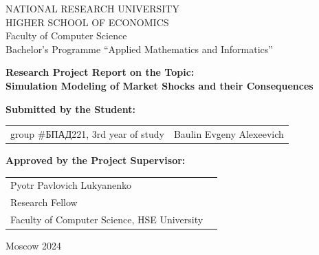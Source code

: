 \begin{titlepage}
    \newpage

    {
        \begin{center}
            NATIONAL RESEARCH UNIVERSITY\\
            HIGHER SCHOOL OF ECONOMICS
            \\
            \bigskip
            Faculty of Computer Science\\
            Bachelor’s Programme “Applied Mathematics and Informatics”
        \end{center}
    }

    \begin{center}
    {\bf Research Project Report on the Topic:}
        \\
        {\bf Simulation Modeling of Market Shocks and their Consequences}\\
    \end{center}

    \vspace{4em}

    {\bf Submitted by the Student: \vspace{2mm}}

    {
        \begin{tabular}{l@{\hskip 1.5cm}l}
            group \#\foreignlanguage{russian}{БПАД}221, 3rd year of study & Baulin Evgeny Alexeevich \\
        \end{tabular}}

    \vspace{1em}
    {\bf Approved by the Project Supervisor: \vspace{2mm}}

    {
        \begin{tabular}{l@{\hskip 1.5cm}l}
            Pyotr Pavlovich Lukyanenko \\
            Research Fellow                \\
            Faculty of Computer Science, HSE University
        \end{tabular}}

    \vspace{\fill}

    \begin{center}
        Moscow 2024
    \end{center}

\end{titlepage}